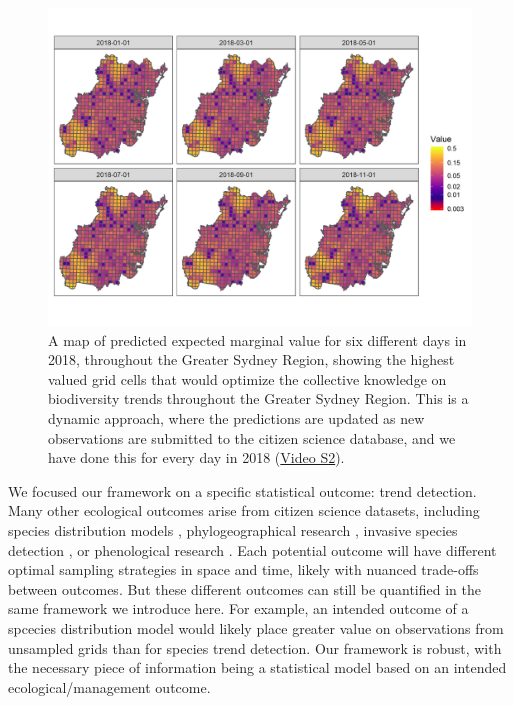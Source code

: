 \documentclass[9pt,twocolumn,twoside,lineno]{pnas-new}
\begin{document}
\begin{figure}[!hb]
\centering
\includegraphics[width=.8\linewidth]{example_maps.png}
\caption{A map of predicted expected marginal value for six different days in 2018, throughout the Greater Sydney Region, showing the highest valued grid cells that would optimize the collective knowledge on biodiversity trends throughout the Greater Sydney Region. This is a dynamic approach, where the predictions are updated as new observations are submitted to the citizen science database, and we have done this for every day in 2018 (\href{https://github.com/coreytcallaghan/optimize_citizen_science_obs/blob/master/Figures/dynamic_map.gif}{Video S2}).}
\label{fig3}
\end{figure}

We focused our framework on a specific statistical outcome: trend detection. Many other ecological outcomes arise from citizen science datasets, including species distribution models \cite{bradsworth2017species, van2013opportunistic}, phylogeographical research \cite{bahls2014new, drury2019continent}, invasive species detection \cite{pocock2017citizen, grason2018citizen}, or phenological research \cite{la2014role, supp2015citizen}. Each potential outcome will have different optimal sampling strategies in space and time, likely with nuanced trade-offs between outcomes. But these different outcomes can still be quantified in the same framework we introduce here. For example, an intended outcome of a spcecies distribution model would likely place greater value on observations from unsampled grids \cite{crawley2001scale} than for species trend detection. Our framework is robust, with the necessary piece of information being a statistical model based on an intended ecological/management outcome.
\end{document}
